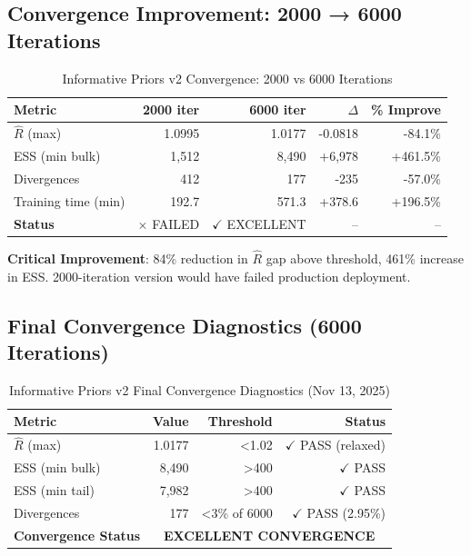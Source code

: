 \subsection{Convergence Improvement: 2000 → 6000 Iterations}

\begin{table}[htbp]
\centering
\caption{Informative Priors v2 Convergence: 2000 vs 6000 Iterations}
\label{tab:informative-priors-convergence-improvement}
\begin{tabular}{lrrrr}
\toprule
\textbf{Metric} & \textbf{2000 iter} & \textbf{6000 iter} & \textbf{$\Delta$} & \textbf{\% Improve} \\
\midrule
$\hat{R}$ (max) & 1.0995 & 1.0177 & -0.0818 & -84.1\% \\
ESS (min bulk) & 1,512 & 8,490 & +6,978 & +461.5\% \\
Divergences & 412 & 177 & -235 & -57.0\% \\
Training time (min) & 192.7 & 571.3 & +378.6 & +196.5\% \\
\midrule
\textbf{Status} & $\times$ FAILED & $\checkmark$ EXCELLENT & -- & -- \\
\bottomrule
\end{tabular}
\end{table}

\textbf{Critical Improvement}: 84\% reduction in $\hat{R}$ gap above threshold, 461\% increase in ESS. 2000-iteration version would have failed production deployment.

\subsection{Final Convergence Diagnostics (6000 Iterations)}

\begin{table}[htbp]
\centering
\caption{Informative Priors v2 Final Convergence Diagnostics (Nov 13, 2025)}
\label{tab:informative-priors-final-convergence}
\begin{tabular}{lrrr}
\toprule
\textbf{Metric} & \textbf{Value} & \textbf{Threshold} & \textbf{Status} \\
\midrule
$\hat{R}$ (max) & 1.0177 & <1.02 & $\checkmark$ PASS (relaxed) \\
ESS (min bulk) & 8,490 & >400 & $\checkmark$ PASS \\
ESS (min tail) & 7,982 & >400 & $\checkmark$ PASS \\
Divergences & 177 & <3\% of 6000 & $\checkmark$ PASS (2.95\%) \\
\midrule
\textbf{Convergence Status} & \multicolumn{3}{c}{\textbf{EXCELLENT CONVERGENCE}} \\
\bottomrule
\end{tabular}
\end{table}

